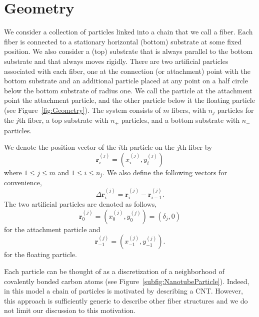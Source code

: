 \section{Geometry}

   We consider a collection of particles linked into a chain that we call a fiber. Each fiber is connected to a stationary horizontal (bottom) substrate at some fixed position. We also consider a (top) substrate that is always parallel to the bottom substrate and that always moves rigidly. There are two artificial particles associated with each fiber, one at the connection (or attachment) point with the bottom substrate and an additional particle placed at any point on a half circle below the bottom substrate of radius one. We call the particle at the attachment point the attachment particle, and the other particle below it the floating particle (see Figure~\ref{fig:Geometry}). The system consists of $m$ fibers, with $n_j$ particles for the $j$th fiber, a top substrate with $n_+$ particles, and a bottom substrate with $n_-$ particles.
	
We denote the position vector of the $i$th particle on the $j$th fiber by
\begin{equation}
	\textbf{r}_i^{(j)} = (x_i^{(j)},y_i^{(j)})
\end{equation}
where $1 \leq j \leq m$ and $1 \leq i \leq n_j$. We also define the following vectors for convenience,
\begin{equation}
	\Delta \textbf{r}_i^{(j)} = \textbf{r}_i^{(j)} - \textbf{r}_{i-1}^{(j)}.
\end{equation}
The two artificial particles are denoted as follows,
\begin{equation}
	\textbf{r}_0^{(j)} = (x_0^{(j)},y_0^{(j)}) = (\delta_j,0)
\end{equation}
for the attachment particle and
\begin{equation}
	\textbf{r}_{-1}^{(j)} = (x_{-1}^{(j)},y_{-1}^{(j)}).
\end{equation}
for the floating particle.

	Each particle can be thought of as a discretization of a neighborhood of covalently bonded carbon atoms (see Figure~\ref{subfig:NanotubeParticle}). Indeed, in this model a chain of particles is motivated by describing a CNT. However, this approach is sufficiently generic to describe other fiber structures and we do not limit our discussion to this motivation.
	
